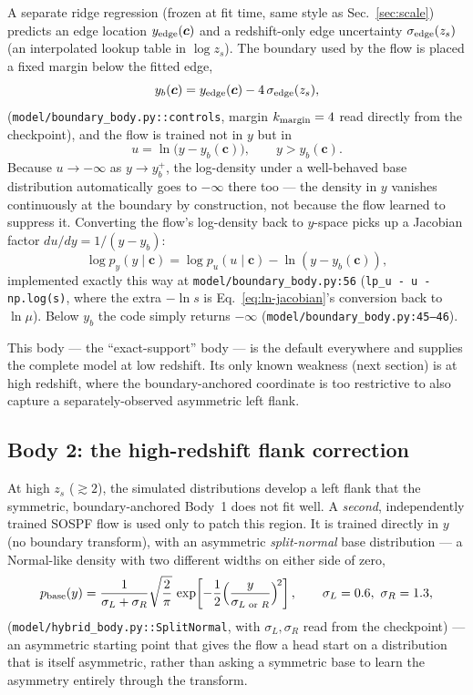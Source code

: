 \documentclass[11pt]{article}
\newcommand{\code}[1]{\texttt{#1}}
\newcommand{\file}[1]{\texttt{#1}}
\newcommand{\vect}[1]{\boldsymbol{#1}}
\begin{document}
A separate ridge regression (frozen at fit time, same style as
Sec.~\ref{sec:scale}) predicts an edge location $y_{\rm edge}(\vect c)$ and
a redshift-only edge uncertainty $\sigma_{\rm edge}(z_s)$ (an interpolated
lookup table in $\log z_s$). The boundary used by the flow is placed a
fixed margin below the fitted edge,
\begin{equation}
 y_b(\vect c) = y_{\rm edge}(\vect c) - 4\,\sigma_{\rm edge}(z_s),
 \label{eq:ybound}
\end{equation}
(\file{model/boundary\_body.py::controls}, margin $k_{\rm margin}=4$ read
directly from the checkpoint), and the flow is trained not in $y$ but in
\begin{equation}
 u = \ln\big(y - y_b(\vect c)\big), \qquad y > y_b(\vect c).
 \label{eq:utransform}
\end{equation}
Because $u\to-\infty$ as $y\to y_b^+$, the log-density under a well-behaved
base distribution automatically goes to $-\infty$ there too — the density
in $y$ vanishes continuously at the boundary by construction, not because
the flow learned to suppress it. Converting the flow's log-density back to
$y$-space picks up a Jacobian factor $du/dy = 1/(y-y_b)$:
\begin{equation}
 \log p_y(y\mid\vect c) = \log p_u(u\mid\vect c) - \ln(y-y_b(\vect c)),
 \label{eq:body1-logp}
\end{equation}
implemented exactly this way at \file{model/boundary\_body.py:56}
(\code{lp\_u - u - np.log(s)}, where the extra $-\ln s$ is
Eq.~\ref{eq:ln-jacobian}'s conversion back to $\ln\mu$). Below $y_b$ the
code simply returns $-\infty$ (\file{model/boundary\_body.py:45–46}).

This body — the ``exact-support'' body — is the default everywhere and
supplies the complete model at low redshift. Its only known weakness (next
section) is at high redshift, where the boundary-anchored coordinate is too
restrictive to also capture a separately-observed asymmetric left flank.

\subsection{Body 2: the high-redshift flank correction}

At high $z_s$ ($\gtrsim 2$), the simulated distributions develop a left
flank that the symmetric, boundary-anchored Body~1 does not fit well. A
\emph{second}, independently trained SOSPF flow is used only to patch this
region. It is trained directly in $y$ (no boundary transform), with an
asymmetric \emph{split-normal} base distribution — a Normal-like density
with two different widths on either side of zero,
\begin{equation}
 p_{\rm base}(y) = \frac{1}{\sigma_L+\sigma_R}\sqrt{\frac{2}{\pi}}\,
 \exp\!\left[-\frac12\Big(\frac{y}{\sigma_{L\text{ or }R}}\Big)^{\!2}\right],
 \qquad \sigma_L = 0.6,\ \sigma_R=1.3,
 \label{eq:splitnormal}
\end{equation}
(\file{model/hybrid\_body.py::SplitNormal}, with $\sigma_L,\sigma_R$ read
from the checkpoint) — an asymmetric starting point that gives the flow a
head start on a distribution that is itself asymmetric, rather than asking
a symmetric base to learn the asymmetry entirely through the transform.
\end{document}
